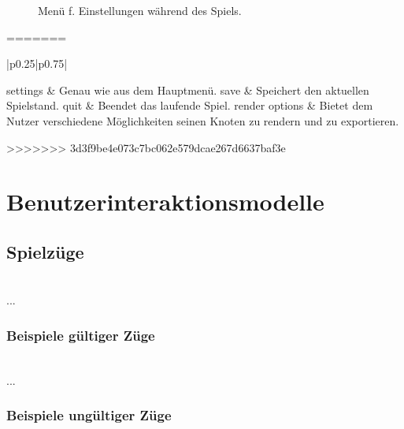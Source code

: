 	\begin{figure}[!ht]
		  \centering
		  
		  \caption{Menü f. Einstellungen während des Spiels.}
	\end{figure}
=======
\begin{longtable}{|p{}|p{}|}

	settings & Genau wie aus dem Hauptmenü.
    \hline
	save & Speichert den aktuellen Spielstand.
    \hline
	quit & Beendet das laufende Spiel.
    \hline
	render options & Bietet dem Nutzer verschiedene Möglichkeiten seinen Knoten zu rendern und zu exportieren.
\end{longtable}

>>>>>>> 3d3f9be4e073c7bc062e579dcae267d6637baf3e
	
\clearpage


\section{Benutzerinteraktionsmodelle}

	\begin{figure}[ht]
		  \centering
		  
	\end{figure}
	
\clearpage

\subsection{Spielzüge}

~\\
...

\subsubsection{Beispiele gültiger Züge}

~\\
...

\subsubsection{Beispiele ungültiger Züge}

